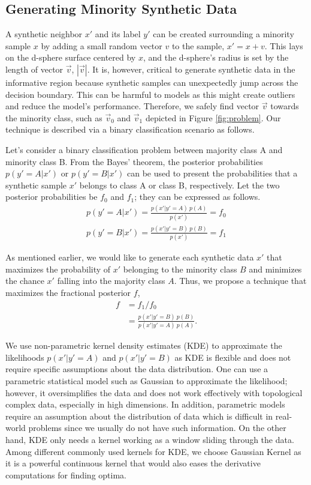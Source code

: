 \subsection{Generating Minority Synthetic Data}  
\label{sec:solvingOptimization}
A synthetic neighbor $ x'$ and its label $y'$ can be created surrounding a minority sample $x$ by adding a small random vector $v$ to the sample, $x' = x + v$. This lays on the d-sphere surface centered by $x$, and the d-sphere's radius is set by the length of vector $\vec{v}$, $|\vec{v}|$. It is, however, critical to generate synthetic data in the informative region because synthetic samples can unexpectedly jump across the decision boundary. This can be harmful to models as this might create outliers and reduce the model's performance. Therefore, we safely find vector $\vec{v}$ towards the minority class, such as $\vec{v}_0$ and $\vec{v}_1$ depicted in Figure \ref{fig:problem}. Our technique is described via a binary classification scenario as follows. 

Let's consider a binary classification problem between majority class A and minority class B. 
From the Bayes' theorem, the posterior probabilities $p(y'=A|x')$ or $p(y'=B|x')$ can be used to present the probabilities that a synthetic sample $x'$ belongs to class A or class B, respectively. Let the two posterior probabilities be $f_0$ and $f_1$; they can be expressed as follows. 
\begin{align}
	\label{eq:posterior}
	p(y'=A|x') = \frac{p(x'|y'=A)\:p(A)}{p(x')} = f_0 \\
	p(y'=B|x') = \frac{p(x'|y'=B)\:p(B)}{p(x')} = f_1  
\end{align}

As mentioned earlier, we would like to generate each synthetic data $x'$ that maximizes the probability of $x'$ belonging to the minority class $B$ and minimizes the chance $x'$ falling into the majority class $A$. Thus, we propose a technique that maximizes the fractional posterior $f$,   
\begin{align}
	\label{eq:fracpost}
	f &= f_1/f_0  \\
	&=\frac{p(x'|y'=B) \:p(B)}{p(x'|y'=A) \: p(A)}. \label{equ:f_ratio}
\end{align}


We use non-parametric kernel density estimates (KDE) to approximate the likelihoods $p(x'|y'=A)$ and $p(x'|y'=B)$ as KDE is flexible and does not require specific assumptions about the data distribution. One can use a parametric statistical model such as Gaussian to approximate the likelihood; however, it oversimplifies the data and does not work effectively with topological complex data, especially in high dimensions. In addition, parametric models require an assumption about the distribution of data which is difficult in real-world problems since we usually do not have such information. On the other hand, KDE only needs a kernel working as a window sliding through the data. Among different commonly used kernels for KDE, we choose Gaussian Kernel as it is a powerful continuous kernel that would also eases the derivative computations for finding optima. 

